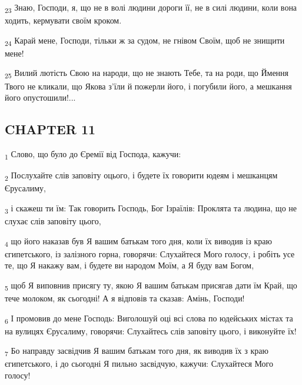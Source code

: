 \begin{tcolorbox}
\textsubscript{23} Знаю, Господи, я, що не в волі людини дороги її, не в силі людини, коли вона ходить, кермувати своїм кроком.
\end{tcolorbox}
\begin{tcolorbox}
\textsubscript{24} Карай мене, Господи, тільки ж за судом, не гнівом Своїм, щоб не знищити мене!
\end{tcolorbox}
\begin{tcolorbox}
\textsubscript{25} Вилий лютість Свою на народи, що не знають Тебе, та на роди, що Ймення Твого не кликали, що Якова з'їли й пожерли його, і погубили його, а мешкання його опустошили!...
\end{tcolorbox}
\subsection{CHAPTER 11}
\begin{tcolorbox}
\textsubscript{1} Слово, що було до Єремії від Господа, кажучи:
\end{tcolorbox}
\begin{tcolorbox}
\textsubscript{2} Послухайте слів заповіту оцього, і будете їх говорити юдеям і мешканцям Єрусалиму,
\end{tcolorbox}
\begin{tcolorbox}
\textsubscript{3} і скажеш ти їм: Так говорить Господь, Бог Ізраїлів: Проклята та людина, що не слухає слів заповіту цього,
\end{tcolorbox}
\begin{tcolorbox}
\textsubscript{4} що його наказав був Я вашим батькам того дня, коли їх виводив із краю єгипетського, із залізного горна, говорячи: Слухайтеся Мого голосу, і робіть усе те, що Я накажу вам, і будете ви народом Моїм, а Я буду вам Богом,
\end{tcolorbox}
\begin{tcolorbox}
\textsubscript{5} щоб Я виповнив присягу ту, якою Я вашим батькам присягав дати їм Край, що тече молоком, як сьогодні! А я відповів та сказав: Амінь, Господи!
\end{tcolorbox}
\begin{tcolorbox}
\textsubscript{6} І промовив до мене Господь: Виголошуй оці всі слова по юдейських містах та на вулицях Єрусалиму, говорячи: Слухайтесь слів заповіту цього, і виконуйте їх!
\end{tcolorbox}
\begin{tcolorbox}
\textsubscript{7} Бо направду засвідчив Я вашим батькам того дня, як виводив їх з краю єгипетського, і до сьогодні Я пильно засвідчую, кажучи: Слухайтеся Мого голосу!
\end{tcolorbox}
